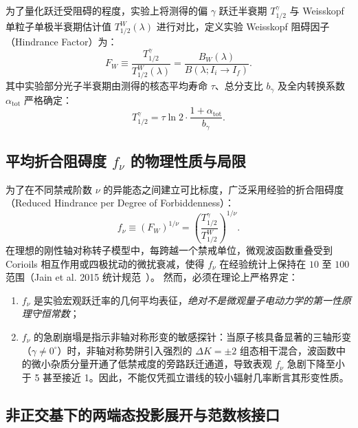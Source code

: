 为了量化跃迁受阻碍的程度，实验上将测得的偏 $\gamma$ 跃迁半衰期 $T_{1/2}^\gamma$ 与 Weisskopf 单粒子单极半衰期估计值 $T_{1/2}^W(\lambda)$ 进行对比，定义实验 Weisskopf 阻碍因子（Hindrance Factor）为：
\begin{equation}\label{eq:appD-hindrance-factor}
F_W \equiv \frac{T_{1/2}^\gamma}{T_{1/2}^W(\lambda)} = \frac{B_W(\lambda)}{B(\lambda; I_i \to I_f)}.
\end{equation}
其中实验部分光子半衰期由测得的核态平均寿命 $\tau$、总分支比 $b_\gamma$ 及全内转换系数 $\alpha_{\mathrm{tot}}$ 严格确定：
\begin{equation}\label{eq:appD-t12-gamma}
T_{1/2}^\gamma = \tau \ln 2 \cdot \frac{1 + \alpha_{\mathrm{tot}}}{b_\gamma}.
\end{equation}

\subsection{平均折合阻碍度 $f_\nu$ 的物理性质与局限}

为了在不同禁戒阶数 $\nu$ 的异能态之间建立可比标度，广泛采用经验的折合阻碍度（Reduced Hindrance per Degree of Forbiddenness）：
\begin{equation}\label{eq:appD-fnu-def}
f_\nu \equiv (F_W)^{1/\nu} = \left( \frac{T_{1/2}^\gamma}{T_{1/2}^W} \right)^{1/\nu}.
\end{equation}
在理想的刚性轴对称转子模型中，每跨越一个禁戒单位，微观波函数重叠受到 Corioils 相互作用或四极扰动的微扰衰减，使得 $f_\nu$ 在经验统计上保持在 $10$ 至 $100$ 范围（Jain et al. 2015 统计规范~\cite{book-jain-nuclear-isomers}）。
然而，必须在理论上严格界定：
\begin{enumerate}
\item $f_\nu$ 是实验宏观跃迁率的几何平均表征，\emph{绝对不是微观量子电动力学的第一性原理守恒常数}；
\item $f_\nu$ 的急剧崩塌是指示非轴对称形变的敏感探针：当原子核具备显著的三轴形变（$\gamma \ne 0^\circ$）时，非轴对称势阱引入强烈的 $\Delta K = \pm 2$ 组态相干混合，波函数中的微小杂质分量开通了低禁戒度的旁路跃迁通道，导致表观 $f_\nu$ 急剧下降至小于 5 甚至接近 1。因此，不能仅凭孤立谱线的较小辐射几率断言其形变性质。
\end{enumerate}

\subsection{非正交基下的两端态投影展开与范数核接口}

